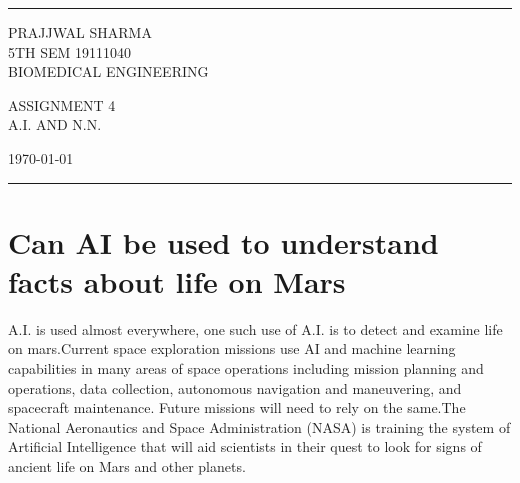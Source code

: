 \documentclass[a4paper]{article}
\begin{document}

\fancyhead[C]{}
\hrule \medskip %
\begin{minipage}{0.295\textwidth} 
\raggedright
\footnotesize
PRAJJWAL SHARMA \hfill\\   
5TH SEM 19111040\hfill\\
BIOMEDICAL ENGINEERING
\end{minipage}
\begin{minipage}{0.4\textwidth} 
\centering 
\large 
ASSIGNMENT 4\\ 
\normalsize 
A.I. AND N.N.\\ 
\end{minipage}
\begin{minipage}{0.295\textwidth} 
\raggedleft
\today\hfill\\
\end{minipage}
\medskip\hrule 
\bigskip


\section{Can AI be used to understand facts about life on Mars}
A.I. is used almost everywhere, one such use of A.I. is to detect and examine life on mars.Current space exploration missions use AI and machine learning capabilities in many areas of space operations including mission planning and operations, data collection, autonomous navigation and maneuvering, and spacecraft maintenance. Future missions will need to rely on the same.The National Aeronautics and Space Administration (NASA) is training the system of Artificial Intelligence that will aid scientists in their quest to look for signs of ancient life on Mars and other planets.
\end{document}
